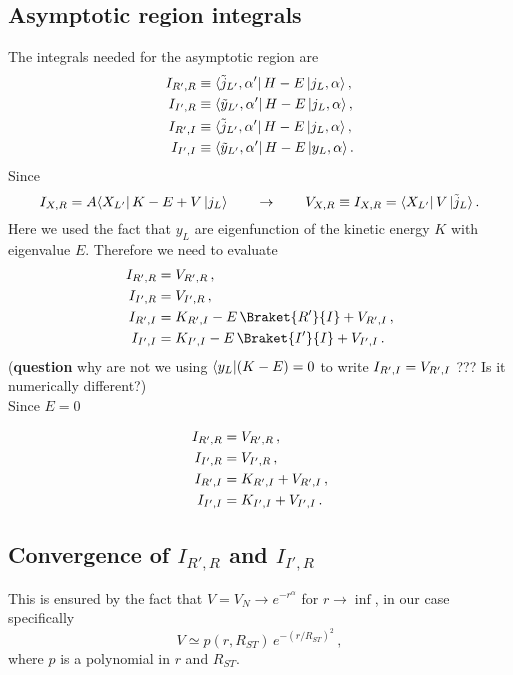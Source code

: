 \documentclass[10pt,a4paper]{article}
\DeclarePairedDelimiter\Bra{\langle}{\rvert}
\DeclarePairedDelimiter\Ket{\lvert}{\rangle}
\newcommand{\bra}[1]{\Bra{#1}}
\newcommand{\ket}[1]{\Ket{#1}}
\newcommand{\braket}[2]{\Braket{#1}{#2}}
\newcommand{\matrixelement}[3]{\bra{#1}\,#2\,\ket{#3}}
\begin{document}
	\subsection{Asymptotic region integrals}
	The integrals needed for the asymptotic region are
	\begin{align}
		\INT{R'}{R}
		&\equiv
		\matrixelement{\tilde{j}_{L'},\alpha'}{H-E}{j_L,\alpha}\,,\\
		\INT{I'}{R}
		&\equiv
		\matrixelement{\tilde{y}_{L'},\alpha'}{H-E}{j_L,\alpha}\,,\\
		\INT{R'}{I}
		&\equiv
		\matrixelement{\tilde{j}_{L'},\alpha'}{H-E}{j_L,\alpha}\,,\\
		\INT{I'}{I}
		&\equiv
		\matrixelement{\tilde{y}_{L'},\alpha'}{H-E}{y_L,\alpha}\,.
	\end{align}
	Since 
	\begin{equation}
		\INT{X}{R} = A
		\matrixelement{X_{L'}}{K-E+V}{j_L} 
		\qquad\rightarrow\qquad
		V_{X,R}\equiv \INT{X}{R} = 
		\matrixelement{X_{L'}}{V}{\tilde{j}_L}\,. 
	\end{equation}
	Here we used the fact that $y_L$ are eigenfunction of the kinetic energy $K$ with eigenvalue $E$.
	Therefore we need to evaluate
	\begin{align}
		\INT{R'}{R}
		& = V_{R',R}\,,\\
		\INT{I'}{R}
		&=V_{I',R}\,,\\
		\INT{R'}{I}
		&= K_{R',I}-E\,\braket{R'}{I}+V_{R',I}\,,\\
		\INT{I'}{I}
		&=
		K_{I',I}-E\,\braket{I'}{I}+V_{I',I}\,.
	\end{align}
	(\textbf{question} why are not we using $\bra{y_L}{(K-E)}=0$ to write $I_{R',I}=V_{R',I}$ ??? Is it numerically different?)\\
	Since $E=0$
	
	\begin{align}
		I_{R',R}
		& = V_{R',R}\,,\\
		I_{I',R}
		&=V_{I',R}\,,\\
		I_{R',I}
		&= K_{R',I}+V_{R',I}\,,\\
		I_{I',I}
		&=
		K_{I',I}+V_{I',I}\,.
	\end{align}
	
	\subsection{Convergence of $I_{R',R}$ and $I_{I',R}$}
	This is ensured by the fact that $V=V_N\rightarrow e^{-r^\alpha}$ for $r\rightarrow \inf$, in our case specifically 
	\begin{equation}
		V\simeq p(r,R_{ST})\,e^{-(r/R_{ST})^2}\,,
	\end{equation}
	where $p$ is a polynomial in $r$ and $R_{ST}$.
	
\end{document}
